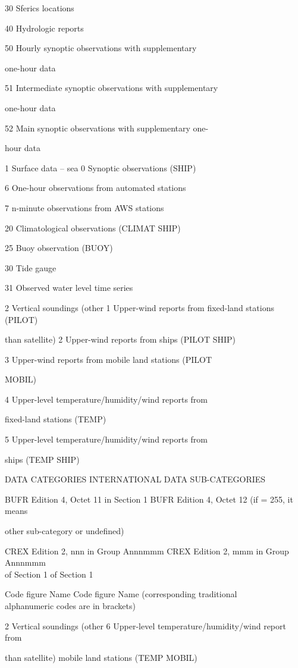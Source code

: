 30 Sferics locations

40 Hydrologic reports

50 Hourly synoptic observations with supplementary

one-hour data

51 Intermediate synoptic observations with supplementary

one-hour data

52 Main synoptic observations with supplementary one-

hour data

1 Surface data -- sea 0 Synoptic observations (SHIP)

6 One-hour observations from automated stations

7 n-minute observations from AWS stations

20 Climatological observations (CLIMAT SHIP)

25 Buoy observation (BUOY)

30 Tide gauge

31 Observed water level time series

2 Vertical soundings (other 1 Upper-wind reports from fixed-land stations (PILOT)

than satellite) 2 Upper-wind reports from ships (PILOT SHIP)

3 Upper-wind reports from mobile land stations (PILOT

MOBIL)

4 Upper-level temperature/humidity/wind reports from

fixed-land stations (TEMP)

5 Upper-level temperature/humidity/wind reports from

ships (TEMP SHIP)

DATA CATEGORIES INTERNATIONAL DATA SUB-CATEGORIES

BUFR Edition 4, Octet 11 in Section 1 BUFR Edition 4, Octet 12 (if = 255, it means

other sub-category or undefined)

CREX Edition 2, nnn in Group Annnmmm CREX Edition 2, mmm in Group Annnmmm\\
of Section 1 of Section 1

Code figure Name Code figure Name (corresponding traditional\\
alphanumeric codes are in brackets)

2 Vertical soundings (other 6 Upper-level temperature/humidity/wind report from

than satellite) mobile land stations (TEMP MOBIL)

